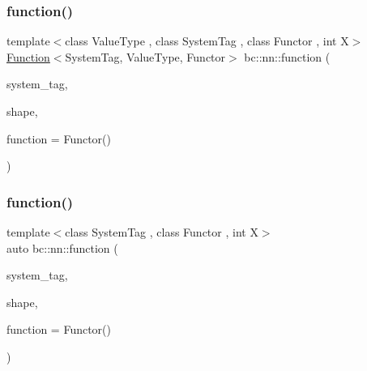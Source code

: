 \mbox{\label{namespacebc_1_1nn_a096e40e3a123e5596200426da91ec617}} 
\subsubsection{\texorpdfstring{function()}{function()}\hspace{0.1cm}{\footnotesize\ttfamily [3/4]}}
{\footnotesize\ttfamily template$<$class Value\+Type , class System\+Tag , class Functor , int X$>$ \\
\hyperlink{structbc_1_1nn_1_1Function}{Function}$<$System\+Tag, Value\+Type, Functor$>$ bc\+::nn\+::function (\begin{DoxyParamCaption}\item[{System\+Tag}]{system\+\_\+tag,  }\item[{\hyperlink{structbc_1_1Dim}{Dim}$<$ X $>$}]{shape,  }\item[{Functor}]{function = {\ttfamily Functor()} }\end{DoxyParamCaption})}

\mbox{\label{namespacebc_1_1nn_a8d19df0b93be99f409be6e2a65ca1052}} 
\subsubsection{\texorpdfstring{function()}{function()}\hspace{0.1cm}{\footnotesize\ttfamily [4/4]}}
{\footnotesize\ttfamily template$<$class System\+Tag , class Functor , int X$>$ \\
auto bc\+::nn\+::function (\begin{DoxyParamCaption}\item[{System\+Tag}]{system\+\_\+tag,  }\item[{\hyperlink{structbc_1_1Dim}{bc\+::\+Dim}$<$ X $>$}]{shape,  }\item[{Functor}]{function = {\ttfamily Functor()} }\end{DoxyParamCaption})}

\mbox{\label{namespacebc_1_1nn_ad126cb88738312204f33d5e21a03bf06}} 
